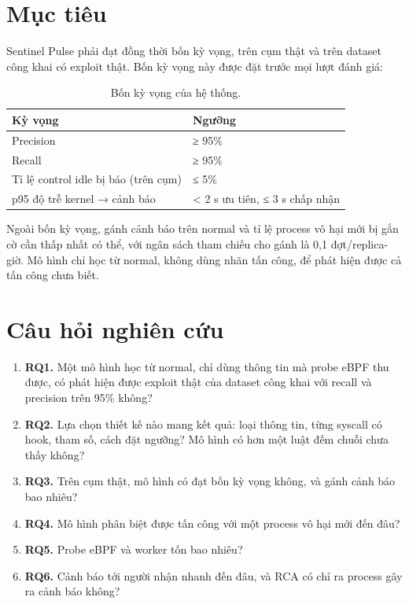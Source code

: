 \section{Mục tiêu}

Sentinel Pulse phải đạt đồng thời bốn kỳ vọng, trên cụm thật và trên dataset công khai có exploit thật. Bốn kỳ vọng này được đặt trước mọi lượt đánh giá:

\begin{longtable}[]{@{}ll@{}}
\caption{Bốn kỳ vọng của hệ thống.}\label{tab:expectations}\\
\toprule\noalign{}
Kỳ vọng & Ngưỡng \\
\midrule\noalign{}
\endhead
\bottomrule\noalign{}
\endlastfoot
Precision & ≥ 95\% \\
Recall & ≥ 95\% \\
Tỉ lệ control idle bị báo (trên cụm) & ≤ 5\% \\
p95 độ trễ kernel → cảnh báo & \textless{} 2 s ưu tiên, ≤ 3 s chấp nhận \\
\end{longtable}

Ngoài bốn kỳ vọng, gánh cảnh báo trên normal và tỉ lệ process vô hại mới bị gắn cờ cần thấp nhất có thể, với ngân sách tham chiếu cho gánh là 0,1 đợt/replica-giờ. Mô hình chỉ học từ normal, không dùng nhãn tấn công, để phát hiện được cả tấn công chưa biết.

\section{Câu hỏi nghiên cứu}

\begin{enumerate}
\def\labelenumi{\arabic{enumi}.}
\tightlist
\item
  \textbf{RQ1.} Một mô hình học từ normal, chỉ dùng thông tin mà probe eBPF thu được, có phát hiện được exploit thật của dataset công khai với recall và precision trên 95\% không?
\item
  \textbf{RQ2.} Lựa chọn thiết kế nào mang kết quả: loại thông tin, từng syscall có hook, tham số, cách đặt ngưỡng? Mô hình có hơn một luật đếm chuỗi chưa thấy không?
\item
  \textbf{RQ3.} Trên cụm thật, mô hình có đạt bốn kỳ vọng không, và gánh cảnh báo bao nhiêu?
\item
  \textbf{RQ4.} Mô hình phân biệt được tấn công với một process vô hại mới đến đâu?
\item
  \textbf{RQ5.} Probe eBPF và worker tốn bao nhiêu?
\item
  \textbf{RQ6.} Cảnh báo tới người nhận nhanh đến đâu, và RCA có chỉ ra process gây ra cảnh báo không?
\end{enumerate}


